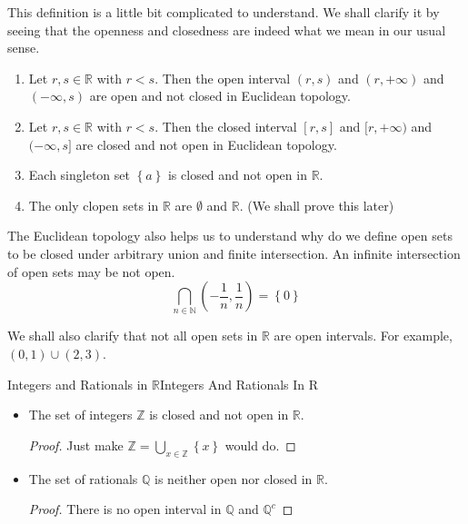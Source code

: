 \documentclass[../main.tex]{subfiles}
\begin{document}
\begin{remark}
This definition is a little bit complicated to understand. We shall clarify it by seeing that the openness and closedness are indeed what we mean in our usual sense.
\begin{enumerate}
	\item Let $r,s\in \mathbb{R}$ with $r<s$. Then the open interval $(r,s)$ and $(r,+\infty )$ and $(-\infty ,s)$ are open and not closed in Euclidean topology.
	\item Let $r,s\in \mathbb{R}$ with $r<s$. Then the closed interval $[r,s]$ and $[r,+\infty )$ and $(-\infty ,s]$ are closed and not open in Euclidean topology.
	\item Each singleton set $\left\{ a \right\}$ is closed and not open in $\mathbb{R}$.
	\item The only clopen sets in $\mathbb{R}$ are $\emptyset $ and $\mathbb{R}$. (We shall prove this later)
\end{enumerate}

The Euclidean topology also helps us to understand why do we define open sets to be closed under arbitrary union and finite intersection. An infinite intersection of open sets may be not open.
\begin{equation*}
\bigcap_{n\in \mathbb{N}} \left(-\frac{1}{n},\frac{1}{n}\right) = \left\{ 0 \right\}
\end{equation*}

We shall also clarify that not all open sets in $\mathbb{R}$ are open intervals. For example, $(0,1)\cup (2,3)$.
\end{remark}
\begin{example}{Integers and Rationals in $\mathbb{R}$}{Integers And Rationals In R}
\begin{itemize}
	\item The set of integers $\mathbb{Z}$ is closed and not open in $\mathbb{R}$.
		\begin{proof}
		Just make $\mathbb{Z} = \bigcup_{x\in \mathbb{Z}} \left\{ x \right\} $ would do.
		\end{proof}
	\item The set of rationals $\mathbb{Q}$ is neither open nor closed in $\mathbb{R}$.
		\begin{proof}
		There is no open interval in $\mathbb{Q}$ and $\mathbb{Q}^c$
		\end{proof}
\end{itemize}
\end{example}
\end{document}
